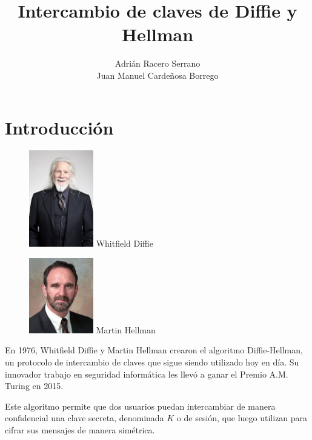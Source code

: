 \documentclass[11pt]{article}
\title{\textbf{\huge Intercambio de claves de Diffie y Hellman}}
\author{Adrián Racero Serrano\\Juan Manuel Cardeñosa Borrego}
\date{}
\begin{document}
\maketitle

\thispagestyle{empty}

\newpage

\setcounter{page}{1}
\tableofcontents

\newpage


\section{Introducción}

\begin{figure} %
    \centering
    \includegraphics[width=0.25\textwidth]{img/Diffie.jpg}
    Whitfield Diffie
    
    \includegraphics[width=0.25\textwidth]{img/Hellman.jpg}
    Martin Hellman
\end{figure}

En 1976, Whitfield Diffie y Martin Hellman crearon el algoritmo Diffie-Hellman, un protocolo de intercambio de claves que sigue siendo utilizado hoy en día. Su innovador trabajo en seguridad informática les llevó a ganar el Premio A.M. Turing en 2015.

Este algoritmo permite que dos usuarios puedan intercambiar de manera confidencial una clave secreta, denominada $K$ o de sesión, que luego utilizan para cifrar sus mensajes de manera simétrica.
\end{document}
